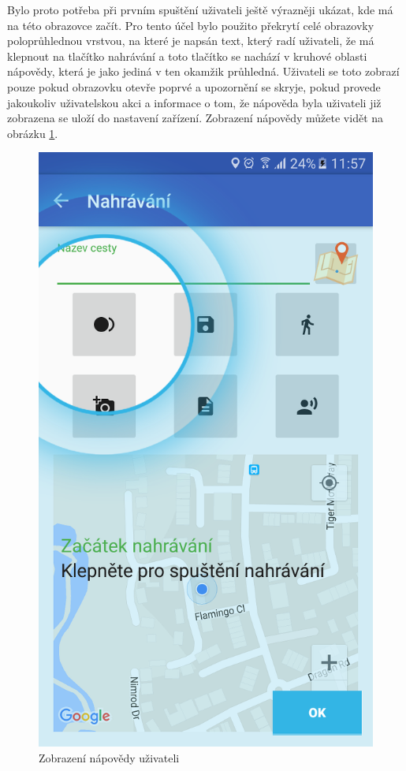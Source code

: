 \documentclass[czech,master,public,dept460,male,java,cpdeclaration]{diploma}
\begin{document}
 Bylo proto potřeba při prvním spuštění uživateli ještě výrazněji ukázat, kde má na této obrazovce začít.
 Pro tento účel bylo použito překrytí celé obrazovky poloprůhlednou vrstvou, na které je napsán text, který radí
 uživateli, že má klepnout na tlačítko nahrávání a toto tlačítko se nachází v kruhové oblasti nápovědy, která je
 jako jediná v ten okamžik průhledná. Uživateli se toto zobrazí pouze pokud obrazovku otevře poprvé
 a upozornění se skryje, pokud provede jakoukoliv uživatelskou akci a informace o tom, že nápověda byla uživateli
 již zobrazena se uloží do nastavení zařízení. Zobrazení nápovědy můžete vidět na obrázku \ref{fig:nahravaninapoveda}.

  \begin{figure}[H]
            \centering
                    \includegraphics[scale=0.14]{img/screen/nahravaninapoveda.png}
            \caption{Zobrazení nápovědy uživateli}
            \label{fig:nahravaninapoveda}
    \end{figure}
\end{document}
